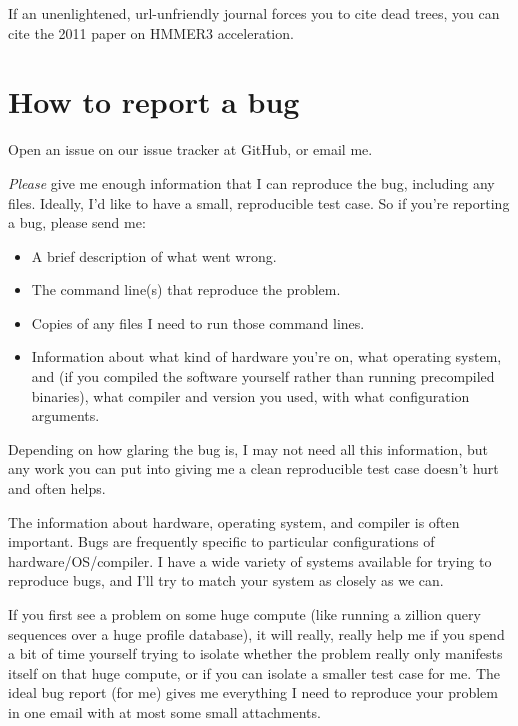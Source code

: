 If an unenlightened, url-unfriendly journal forces you to cite dead
trees, you can cite the 2011 paper on HMMER3
acceleration.\cite{Eddy11}



\section{How to report a bug}

Open an issue on our issue tracker at GitHub,
or email me.

\emph{Please} give me enough information that I can reproduce the
bug, including any files.  Ideally, I'd like to have a small,
reproducible test case.  So if you're reporting a bug, please send me:

\begin{itemize}
 \item A brief description of what went wrong.
 \item The command line(s) that reproduce the problem.
 \item Copies of any files I need to run those command lines.
 \item Information about what kind of hardware you're on, what
   operating system, and (if you compiled the software yourself rather
   than running precompiled binaries), what compiler and version you
   used, with what configuration arguments.
\end{itemize}

Depending on how glaring the bug is, I may not need all this
information, but any work you can put into giving me a clean
reproducible test case doesn't hurt and often helps.

The information about hardware, operating system, and compiler is
often important. Bugs are frequently specific to particular
configurations of hardware/OS/compiler.  I have a wide variety of
systems available for trying to reproduce bugs, and I'll try to match
your system as closely as we can.

If you first see a problem on some huge compute (like running a
zillion query sequences over a huge profile database), it will really,
really help me if you spend a bit of time yourself trying to isolate
whether the problem really only manifests itself on that huge compute,
or if you can isolate a smaller test case for me. The ideal bug report
(for me) gives me everything I need to reproduce your problem in one
email with at most some small attachments.  

